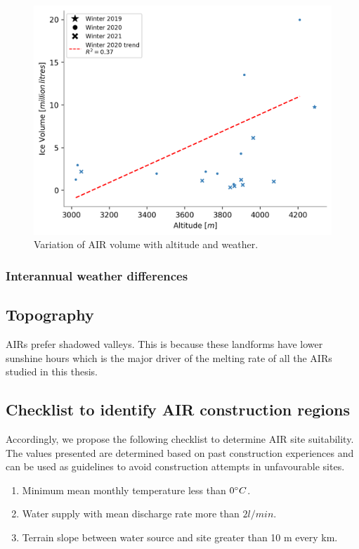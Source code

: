 \begin{figure}[t]
\centering
\includegraphics[width=12cm]{Figures/altitudevsvolume.png}
\caption{Variation of AIR volume with altitude and weather.}
\label{fig:altitudevsvolume}
\end{figure}

\subsubsection{Interannual weather differences}

\subsection{Topography}

AIRs prefer shadowed valleys. This is because these landforms have lower sunshine hours which is the major
driver of the melting rate of all the AIRs studied in this thesis.

\subsection{Checklist to identify AIR construction regions}

Accordingly, we propose the following checklist to determine AIR site suitability. The values presented are
determined based on past construction experiences and can be used as guidelines to avoid construction attempts
in unfavourable sites.

\begin{enumerate}

  \item Minimum mean monthly temperature less than $0 ^{\circ} C$. 
  \item Water supply with mean discharge rate more than $2 l/min$. 
  \item Terrain slope between water source and site greater than 10 m every km. 

\end{enumerate}

